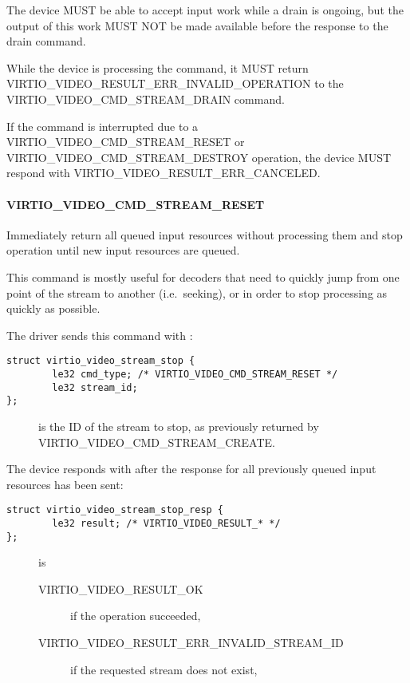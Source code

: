 The device MUST be able to accept input work while a drain is ongoing,
but the output of this work MUST NOT be made available before the
response to the drain command.

While the device is processing the command, it MUST return
VIRTIO_VIDEO_RESULT_ERR_INVALID_OPERATION to the
VIRTIO_VIDEO_CMD_STREAM_DRAIN command.

If the command is interrupted due to a VIRTIO_VIDEO_CMD_STREAM_RESET
or VIRTIO_VIDEO_CMD_STREAM_DESTROY operation, the device MUST
respond with VIRTIO_VIDEO_RESULT_ERR_CANCELED.

\paragraph{VIRTIO_VIDEO_CMD_STREAM_RESET}\label{sec:Device Types / Video Device / Device Operation / Device Operation: Stream commands / VIRTIO_VIDEO_CMD_STREAM_RESET}

Immediately return all queued input resources without processing them
and stop operation until new input resources are queued.

This command is mostly useful for decoders that need to quickly jump
from one point of the stream to another (i.e.~seeking), or in order to
stop processing as quickly as possible.

The driver sends this command with
:

\begin{lstlisting}
struct virtio_video_stream_stop {
        le32 cmd_type; /* VIRTIO_VIDEO_CMD_STREAM_RESET */
        le32 stream_id;
};
\end{lstlisting}

\begin{description}
\item[]
is the ID of the stream to stop, as previously returned by
VIRTIO_VIDEO_CMD_STREAM_CREATE.
\end{description}

The device responds with 
after the response for all previously queued input resources has been
sent:

\begin{lstlisting}
struct virtio_video_stream_stop_resp {
        le32 result; /* VIRTIO_VIDEO_RESULT_* */
};
\end{lstlisting}

\begin{description}
\item[]
is

\begin{description}
\item[VIRTIO_VIDEO_RESULT_OK]
if the operation succeeded,
\item[VIRTIO_VIDEO_RESULT_ERR_INVALID_STREAM_ID]
if the requested stream does not exist,
\end{description}
\end{description}

